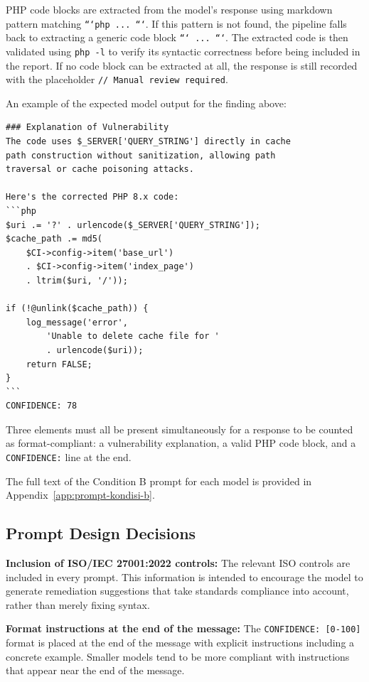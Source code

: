 PHP code blocks are extracted from the model's response using markdown pattern matching \texttt{```php ... ```}. If this pattern is not found, the pipeline falls back to extracting a generic code block \texttt{``` ... ```}. The extracted code is then validated using \texttt{php -l} to verify its syntactic correctness before being included in the report. If no code block can be extracted at all, the response is still recorded with the placeholder \texttt{// Manual review required}.

\newpage
An example of the expected model output for the finding above:

\begin{lstlisting}[style=promptstyle]
### Explanation of Vulnerability
The code uses $_SERVER['QUERY_STRING'] directly in cache
path construction without sanitization, allowing path
traversal or cache poisoning attacks.

Here's the corrected PHP 8.x code:
```php
$uri .= '?' . urlencode($_SERVER['QUERY_STRING']);
$cache_path .= md5(
    $CI->config->item('base_url')
    . $CI->config->item('index_page')
    . ltrim($uri, '/'));

if (!@unlink($cache_path)) {
    log_message('error',
        'Unable to delete cache file for '
        . urlencode($uri));
    return FALSE;
}
```
CONFIDENCE: 78
\end{lstlisting}

Three elements must all be present simultaneously for a response to be counted as format-compliant: a vulnerability explanation, a valid PHP code block, and a \texttt{CONFIDENCE:} line at the end.

The full text of the Condition B prompt for each model is provided in Appendix~\ref{app:prompt-kondisi-b}.

\subsection{Prompt Design Decisions}

\textbf{Inclusion of ISO/IEC 27001:2022 controls:} The relevant ISO controls are included in every prompt. This information is intended to encourage the model to generate remediation suggestions that take standards compliance into account, rather than merely fixing syntax.

\textbf{Format instructions at the end of the message:} The \texttt{CONFIDENCE: [0-100]} format is placed at the end of the message with explicit instructions including a concrete example. Smaller models tend to be more compliant with instructions that appear near the end of the message.


